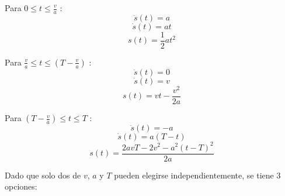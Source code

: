         Para $0 \leq t \leq \frac{v}{a}$ :
        \begin{equation}
            \ddot{s}(t)=a 
            \label{eq:cap4_tray_30}
        \end{equation}
        \begin{equation}
            \dot{s}(t)=at
            \label{eq:cap4_tray_31}
        \end{equation}
        \begin{equation}
             s(t)=\frac{1}{2}at^2
            \label{eq:cap4_tray_32}
        \end{equation}
        
        Para $ \frac{v}{a} \leq t \leq  (T-\frac{v}{a})$ :
        \begin{equation}
            \ddot{s}(t)=0 
            \label{eq:cap4_tray_33}
        \end{equation}
        \begin{equation}
            \dot{s}(t)=v
            \label{eq:cap4_tray_34}
        \end{equation}
        \begin{equation}
             s(t)=vt - \frac{v^2}{2a}
            \label{eq:cap4_tray_35}
        \end{equation}
        
        Para $ (T-\frac{v}{a}) \leq t \leq  T$ :
        \begin{equation}
            \ddot{s}(t)=-a 
            \label{eq:cap4_tray_36}
        \end{equation}
        \begin{equation}
            \dot{s}(t)=a(T-t)
            \label{eq:cap4_tray_37}
        \end{equation}
        \begin{equation}
             s(t)=\frac{2avT-2v^2-a^2(t-T)^2}{2a}
            \label{eq:cap4_tray_38}
        \end{equation}        
        
    Dado que solo dos de $v$, $a$ y $T$ pueden elegirse independientemente, se tiene 3 opciones:
    

